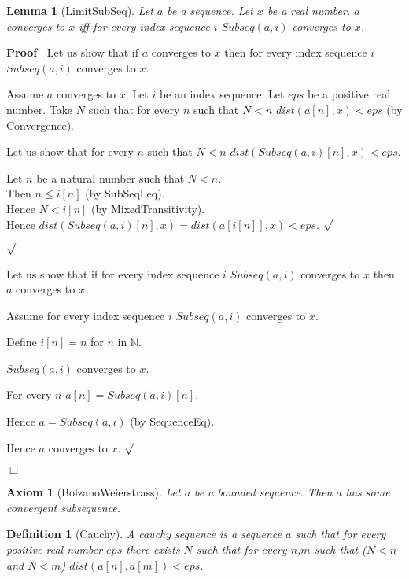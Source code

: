 \documentclass{article}
\newenvironment{forthel}{\begin{leftbar}}{\end{leftbar}}
\newenvironment{proof}{\noindent\textbf{Proof\ }}{\hspace*{\fill}$\Box$\medskip}
\newenvironment{subproof}{\begin{list}{}{}
		\item[\text{Proof}]}{\hfill $\surd$ \end{list}}
\newtheorem{axiom}{Axiom}
\newtheorem{lemma}{Lemma}
\newtheorem{definition}{Definition}
\newcommand{\NN}{\mathbb{N}}
\begin{document}
\begin{forthel}
	\begin{lemma}[LimitSubSeq]
		Let $a$ be a sequence. Let $x$ be a real number. $a$ converges to $x$ iff for every index sequence $i$ $Subseq(a,i)$ converges to $x$. 
	\end{lemma}
	\begin{proof}
		Let us show that if $a$ converges to $x$ then for every index sequence $i$ $Subseq(a,i)$ converges to $x$.
		
		\begin{subproof}
			Assume $a$ converges to $x$. 
			Let $i$ be an index sequence.
			Let $eps$ be a positive real number.
			Take $N$ such that for every $n$ such that $N < n$ $dist(a[n],x) < eps$ (by Convergence).
			
			Let us show that for every $n$ such that $N < n$ $dist(Subseq(a,i)[n],x) < eps$.
			\begin{subproof}
				Let $n$ be a natural number such that $N < n$.\\
				Then $n \leq i[n]$ (by SubSeqLeq).\\
				Hence $N < i[n]$ (by MixedTransitivity).\\
				Hence $dist(Subseq(a,i)[n],x) = dist(a[i[n]],x) < eps$.
			\end{subproof}
		\end{subproof}
		Let us show that if for every index sequence $i$ $Subseq(a,i)$ converges to $x$ then $a$ converges to $x$.
		
		\begin{subproof}
			Assume for every index sequence $i$ $Subseq(a,i)$ converges to $x$. 
			
			Define $i[n] = n$ for $n$ in $\NN$.
			
			$Subseq(a,i)$ converges to $x$.
			
			For every $n$ $a[n] = Subseq(a,i)[n]$.
			
			Hence $a = Subseq(a,i)$ (by SequenceEq).
			
			Hence $a$ converges to $x$.
		\end{subproof}
	\end{proof}
	
	\begin{axiom}[BolzanoWeierstrass]
		Let $a$ be a bounded sequence. Then $a$ has some convergent subsequence. 
	\end{axiom}
	
	\begin{definition}[Cauchy]
		A cauchy sequence is a sequence $a$ such that for every positive real number $eps$ there exists $N$ such that
		for every $n$,$m$ such that ($N < n$ and $N < m$) $dist(a[n],a[m]) < eps$.
	\end{definition}
	

\end{forthel}
\end{document}

